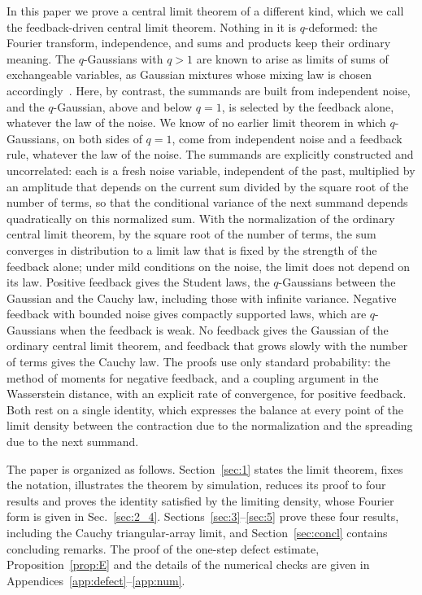 \documentclass[aip,jmp,preprint,onecolumn,floatfix,superscriptaddress,nofootinbib,11pt]{revtex4-2}
\theoremstyle{plain}
\theoremstyle{remark}
\numberwithin{equation}{section}
\begin{document}
In this paper we prove a central limit theorem of a different kind, which we call the feedback-driven central limit theorem. Nothing in it is $q$-deformed: the Fourier transform, independence, and sums and products keep their ordinary meaning. The $q$-Gaussians with $q>1$ are known to arise as limits of sums of exchangeable variables, as Gaussian mixtures whose mixing law is chosen accordingly~\cite{HJU2010}. Here, by contrast, the summands are built from independent noise, and the $q$-Gaussian, above and below $q=1$, is selected by the feedback alone, whatever the law of the noise. We know of no earlier limit theorem in which $q$-Gaussians, on both sides of $q=1$, come from independent noise and a feedback rule, whatever the law of the noise. The summands are explicitly constructed and uncorrelated: each is a fresh noise variable, independent of the past, multiplied by an amplitude that depends on the current sum divided by the square root of the number of terms, so that the conditional variance of the next summand depends quadratically on this normalized sum. With the normalization of the ordinary central limit theorem, by the square root of the number of terms, the sum converges in distribution to a limit law that is fixed by the strength of the feedback alone; under mild conditions on the noise, the limit does not depend on its law. Positive feedback gives the Student laws, the $q$-Gaussians between the Gaussian and the Cauchy law, including those with infinite variance. Negative feedback with bounded noise gives compactly supported laws, which are $q$-Gaussians when the feedback is weak. No feedback gives the Gaussian of the ordinary central limit theorem, and feedback that grows slowly with the number of terms gives the Cauchy law. The proofs use only standard probability: the method of moments for negative feedback, and a coupling argument in the Wasserstein distance, with an explicit rate of convergence, for positive feedback. Both rest on a single identity, which expresses the balance at every point of the limit density between the contraction due to the normalization and the spreading due to the next summand.
 
The paper is organized as follows. Section~\ref{sec:1} states the limit theorem, fixes the notation, illustrates the theorem by simulation, reduces its proof to four results and proves the identity satisfied by the limiting density, whose Fourier form is given in Sec.~\ref{sec:2_4}. Sections~\ref{sec:3}--\ref{sec:5} prove these four results, including the Cauchy triangular-array limit, and Section~\ref{sec:concl} contains concluding remarks. The proof of the one-step defect estimate, Proposition~\ref{prop:E} and the details of the numerical checks are given in Appendices~\ref{app:defect}--\ref{app:num}.
 
\end{document}

